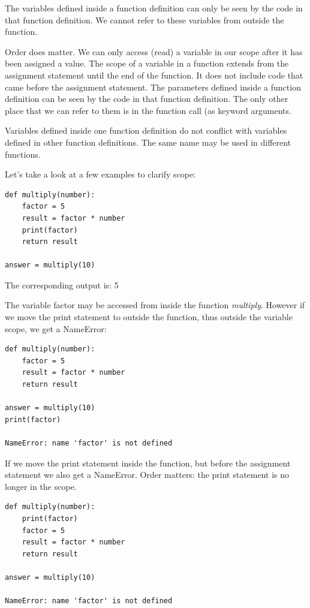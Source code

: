 \documentclass{article}
\begin{document}
The variables defined inside a function definition can only be seen by the code in that function definition.  We cannot refer to these variables from outside the function.


Order does matter.  We can only access (read) a variable in our scope after it has been assigned a value.  The scope of a variable in a function extends from the assignment statement until the end of the function.  It does not include code that came before the assignment statement.
The parameters defined inside a function definition can be seen by the code in that function definition.  The only other place that we can refer to them is in the function call (as keyword arguments. 

Variables defined inside one function definition do not conflict with variables defined in other function definitions.  The same name may be used in different functions.
 
Let's take a look at a few examples to clarify scope:

\begin{lstlisting}
def multiply(number):
    factor = 5
    result = factor * number
    print(factor)
    return result
 
answer = multiply(10)

\end{lstlisting}
 
The corresponding output is: 5
 
The variable factor may be accessed from inside the function \textit{multiply}. However if we move the print statement to outside the function, thus outside the variable scope, we get a NameError:

\begin{lstlisting} 
def multiply(number):
    factor = 5
    result = factor * number
    return result
 
answer = multiply(10)
print(factor)
 
NameError: name 'factor' is not defined
\end{lstlisting}
 
If we move the print statement inside the function, but before the assignment statement we also get a NameError.  Order matters: the print statement is no longer in the scope.

\begin{lstlisting} 
def multiply(number):
    print(factor)
    factor = 5
    result = factor * number
    return result
 
answer = multiply(10)
 
NameError: name 'factor' is not defined
\end{lstlisting}
 
\end{document}
